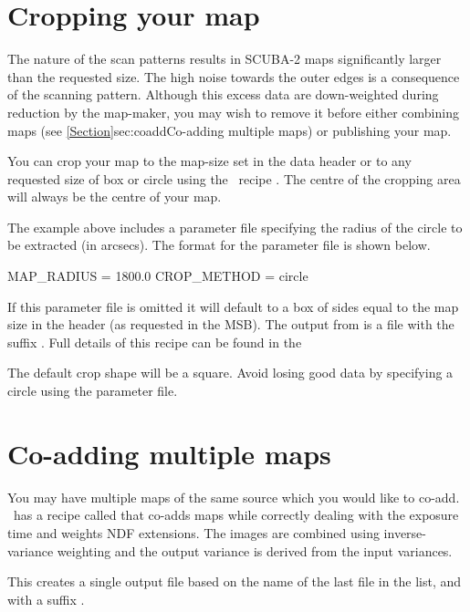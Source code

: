 \section{Cropping your map}
\label{sec:crop}

The nature of the scan patterns results in SCUBA-2 maps significantly
larger than the requested size. The high noise towards the outer edges
is a consequence of the scanning pattern. Although this excess data
are down-weighted during reduction by the map-maker, you may wish to
remove it before either combining maps (see
\cref{Section}{sec:coadd}{Co-adding multiple maps}) or publishing your
map.

You can crop your map to the map-size set in the data header or to any
requested size of box or circle using the \picard\ recipe
.
The centre of the cropping area will always be the centre of your map.
\begin{terminalv}
\end{terminalv}
The example above includes a parameter file specifying the radius of
the circle to be extracted (in arcsecs).  The format for the parameter
file is shown below.
\begin{terminalv}
MAP_RADIUS = 1800.0
CROP_METHOD = circle
\end{terminalv}


If this parameter file is omitted it will default to a box of sides
equal to the map size in the header (as requested in the MSB). The
output from  is a file with the suffix
. Full details of this recipe can be found in the

\begin{tip}
  The default crop shape will be a square. Avoid losing good data by
  specifying a circle using the parameter file.
\end{tip}

\section{Co-adding multiple maps}
\label{sec:coadd}

You may have multiple maps of the same source which you would like to
co-add. \picard\ has a recipe called
that co-adds maps while correctly dealing with the exposure time and
weights NDF extensions. The images are combined using inverse-variance
weighting and the output variance is derived from the input variances.
\begin{terminalv}
\end{terminalv}
This creates a single output file based on the name of the last file
in the list, and with a suffix .

